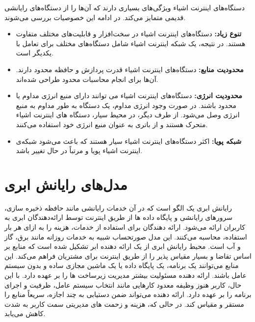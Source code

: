 \newpage

دستگاه‌های اینترنت اشیاء ویژگی‌های بسیاری دارند که آن‌ها را از دستگاه‌های رایانشی قدیمی متمایز می‌کند. در ادامه این خصوصیات بررسی می‌شوند.

\begin{itemize}
	
	\item \textbf{تنوع زیاد:} دستگاه‌های اینترنت اشیاء در سخت‌افزار و قابلیت‌های مختلف متفاوت هستند. در نتیجه، یک شبکه اینترنت اشیاء شامل دستگاه‌های مختلف برای تعامل با یکدیگر است.
	
	\item \textbf{محدودیت منابع:} دستگاه‌های اینترنت اشیاء قدرت پردازش و حافظه محدود دارند. آن‌ها برای انجام محاسبات محدود طراحی شده‌اند.
	
	\item \textbf{محدودیت انرژی:} دستگاه‌های اینترنت اشیاء می توانند دارای منبع انرژی مداوم یا محدود باشند. در صورت وجود انرژی مداوم، یک دستگاه به طور مداوم به منبع انرژی وصل می‌شود. از طرف دیگر، در محیط سیار، دستگاه های اینترنت اشیاء متحرک هستند و از باتری به عنوان منبع انرژی خود استفاده می‌کنند.
	
	\item \textbf{شبکه پویا:} اکثر دستگاه‌های اینترنت اشیاء سیار هستند که باعث می‌شود شبکه‌ی اینترنت اشیاء پویا و مرتباً در حال تغییر باشد.
	
\end{itemize}

\newpage

\section{مدل‌های رایانش ابری}

رایانش ابری یک الگو است که در آن خدمات رایانشی مانند حافظه ذخیره سازی، سرورهای رایانشی و پایگاه داده ها از طریق اینترنت توسط ارائه‌دهندگان ابری به کاربران ارائه می‌شود. ارائه دهندگان برای استفاده از خدمات، هزینه را به ازای هر بار استفاده، محاسبه می‌کنند. این مدل صورتحساب شبیه به خدمات روزانه مانند برق، گاز و آب است. محیط رایانش ابری از یک ارائه دهنده ابر تشکیل شده است که منابع بر اساس تقاضا و بسیار مقیاس پذیر را از طریق اینترنت برای مشتریان فراهم می‌کند. این منابع می‌توانند یک برنامه، یک پایگاه داده یا یک ماشین مجازی ساده و بدون سیستم عامل باشند. ارائه دهنده مسئولیت بیشتر مدیریت زیرساخت ها را بر عهده دارد. با این حال، کاربر هنوز وظیفه معدود کارهایی مانند انتخاب سیستم عامل، ظرفیت و اجرای برنامه را بر عهده دارد. ارائه دهنده می‌تواند ضمن دستیابی به چند اجازه، سریعاً منابع را مستقر و مقیاس کند. در حالی که، هزینه و زحمت های مدیریتی سمت کاربر به شدت کاهش می‌یابد.

